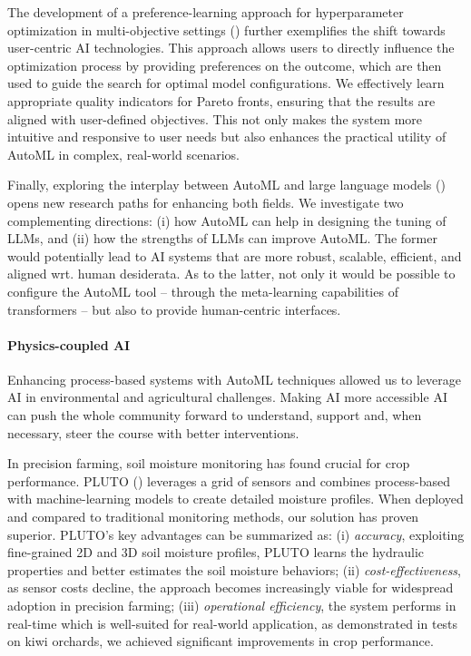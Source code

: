 The development of a preference-learning approach for hyperparameter optimization in multi-objective settings () further exemplifies the shift towards user-centric AI technologies.
This approach allows users to directly influence the optimization process by providing preferences on the outcome, which are then used to guide the search for optimal model configurations.
We effectively learn appropriate quality indicators for Pareto fronts, ensuring that the results are aligned with user-defined objectives.
This not only makes the system more intuitive and responsive to user needs but also enhances the practical utility of AutoML in complex, real-world scenarios.

Finally, exploring the interplay between AutoML and large language models () opens new research paths for enhancing both fields.
We investigate two complementing directions: (i) how AutoML can help in designing the tuning of LLMs, and (ii) how the strengths of LLMs can improve AutoML.
The former would potentially lead to AI systems that are more robust, scalable, efficient, and aligned wrt. human desiderata.
As to the latter, not only it would be possible to configure the AutoML tool -- through the meta-learning capabilities of transformers -- but also to provide human-centric interfaces.

\paragraph{Physics-coupled AI}
Enhancing process-based systems with AutoML techniques allowed us to leverage AI in environmental and agricultural challenges.
Making AI more accessible AI can push the whole community forward to understand, support and, when necessary, steer the course with better interventions.

In precision farming, soil moisture monitoring has found crucial for crop performance.
PLUTO () leverages a grid of sensors and combines process-based with machine-learning models to create detailed moisture profiles.
When deployed and compared to traditional monitoring methods, our solution has proven superior.
PLUTO's key advantages can be summarized as: (i) \textit{accuracy}, exploiting fine-grained 2D and 3D soil moisture profiles, PLUTO learns the hydraulic properties and better estimates the soil moisture behaviors;
(ii) \textit{cost-effectiveness}, as sensor costs decline, the approach becomes increasingly viable for widespread adoption in precision farming;
(iii) \textit{operational efficiency}, the system performs in real-time which is well-suited for real-world application, as demonstrated in tests on kiwi orchards, we achieved significant improvements in crop performance.

